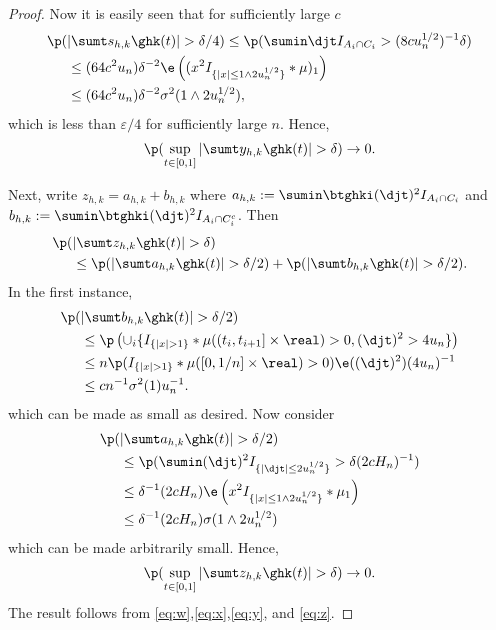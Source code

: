 \begin{proof}
Now it is easily seen that for sufficiently large $c$
\begin{align}
  \p(&\vert \sumt s_{h,k} \ghk(t) \vert > \delta/4) \le \p( \sumin  \djt I_{A_i \cap C_i} > (8 c u_n^{1/2})^{-1}\delta) \notag\\
  &\le (64 c^2 u_n)\delta^{-2} \e\left( (x^2I_{\{\vert x\vert \le 1 \wedge 2 u_n^{1/2}\}}\ast\mu)_1  \right)\notag \\
  & \le  (64 c^2 u_n)\delta^{-2} \sigma^2(1 \wedge 2 u_n^{1/2}),
  \label{}
\end{align}
which is less than $\varepsilon/4$ for sufficiently large $n$.
Hence, 
\begin{align}
  \notag
  \p(\sup_{t \in [0,1]}\vert \sumt y_{h,k} \ghk(t) \vert > \delta) \to 0.\label{eq:y}
\end{align}

Next,  write $z_{h,k} = a_{h,k} + b_{h,k}$ where $a_{h,k} :=  \sumin \btghki(\djt)^2I_{A_i \cap C_i}$ and  $b_{h,k} := \sumin \btghki(\djt)^2I_{A_i \cap C_i^c}$. Then 
\begin{align}
  \p(&\vert \sumt z_{h,k} \ghk(t) \vert   > \delta) \notag \\ &\le \p(\vert \sumt a_{h,k} \ghk(t) \vert > \delta/2) + \p(\vert \sumt b_{h,k} \ghk(t) \vert > \delta/2)\notag.
\end{align}
In the first instance,
\begin{align}
  \p(&\vert \sumt b_{h,k} \ghk(t) \vert > \delta/2) \notag \\ &\le
\p\left(\cup_i\{I_{\{\vert x \vert > 1\}}\ast \mu( (t_i, t_{i + 1}] \times \real) > 0   , (\djt)^2 > 4u_n\}\right) \notag \\
&\le n \p(I_{\{\vert x \vert > 1\}}\ast \mu( [0, 1/n] \times \real) > 0) \e((\djt)^2)(4u_n)^{-1}\notag \\
&\le cn^{-1}\sigma^2(1)  u^{-1}_n.
\end{align}
which can be made as small as desired. Now consider
\begin{align}
  \p(&\vert \sumt a_{h,k} \ghk(t) \vert > \delta/2) \notag \\ &\le \p( \sumin (\djt)^2 I_{\{\vert \djt \vert \le 2u_n^{1/2} \}} > \delta (2 c H_n)^{-1} )\notag\\
  &\le\delta^{-1} (2 c H_n)\e\left( x^2I_{\{\vert x\vert \le 1 \wedge 2 u_n^{1/2}\}}\ast\mu_1  \right)\notag \\
  &\le \delta^{-1} (2 c H_n) \sigma(1 \wedge 2u_n^{1/2})\notag
  \label{}
\end{align}
which can be made arbitrarily small.
Hence, 
\begin{align}
  \p(\sup_{t \in [0,1]}\vert \sumt z_{h,k} \ghk(t) \vert > \delta) \to 0.\label{eq:z}
\end{align}
The result follows from \eqref{eq:w},\eqref{eq:x},\eqref{eq:y}, and \eqref{eq:z}.
\end{proof}

